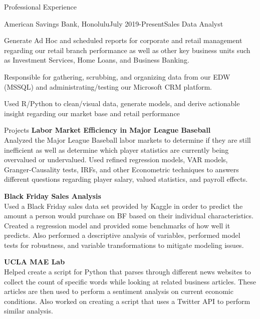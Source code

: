 \documentclass{resume} %
\begin{document}
\begin{rSection}{Professional Experience}
\begin{rSubsection}{American Savings Bank, Honolulu}{July 2019-Present}{Sales Data Analyst}{}
\item Generate Ad Hoc and scheduled reports for corporate and retail management regarding our retail branch performance as well as other key business units such as Investment Services, Home Loans, and Business Banking.
\item Responsible for gathering, scrubbing, and organizing data from our EDW (MSSQL) and administrating/testing our Microsoft CRM platform.
\item Used R/Python to clean/visual data, generate models, and derive actionable insight regarding our market base and retail performance
\end{rSubsection}
\end{rSection}
\begin{rSection}{Projects}
{\bf Labor Market Efficiency in Major League Baseball}\\
Analyzed the Major League Baseball labor markets to determine if they are still inefficient as well as determine which player statistics are currently being overvalued or undervalued. Used refined regression models, VAR models, Granger-Causality tests, IRFs, and other Econometric techniques  to answers different questions regarding player salary, valued statistics, and payroll effects. 

{\bf Black Friday Sales Analysis}\\
 Used a Black Friday sales data set provided by Kaggle in order to predict the amount a person would purchase on BF based on their individual characteristics. Created a regression model and provided some benchmarks of how well it predicts. Also performed a descriptive analysis of variables, performed model tests for robustness, and variable transformations to mitigate modeling issues. 

{\bf UCLA MAE Lab}\\
 Helped create a script for Python that parses through different news websites to collect the count of specific words while looking at related business articles. These articles are then used to perform a sentiment analysis on current economic conditions. Also worked on creating a script that uses a Twitter API to perform similar analysis.

\end{rSection}
\end{document}
